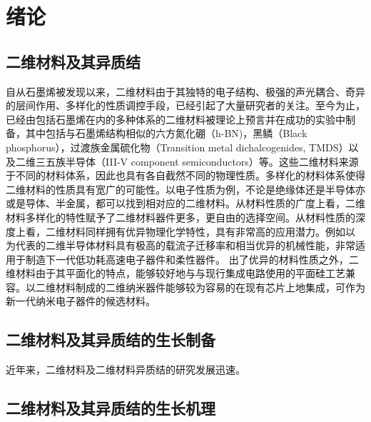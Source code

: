 \chapter{绪\hspace{6pt}论}

\section{二维材料及其异质结}
自从石墨烯被发现以来，二维材料由于其独特的电子结构、极强的声光耦合、奇异的层间作用、多样化的性质调控手段，已经引起了大量研究者的关注。至今为止，已经由包括石墨烯在内的多种体系的二维材料被理论上预言并在成功的实验中制备，其中包括与石墨烯结构相似的六方氮化硼（h-BN)，黑鳞（Black phosphorus），过渡族金属硫化物（Transition metal dichalcogenides, TMDS）以及二维三五族半导体（III-V component semiconductors）等。这些二维材料来源于不同的材料体系，因此也具有各自截然不同的物理性质。多样化的材料体系使得二维材料的性质具有宽广的可能性。以电子性质为例，不论是绝缘体还是半导体亦或是导体、半金属，都可以找到相对应的二维材料。从材料性质的广度上看，二维材料多样化的特性赋予了二维材料器件更多，更自由的选择空间。从材料性质的深度上看，二维材料同样拥有优异物理化学特性，具有非常高的应用潜力。例如以
为代表的二维半导体材料具有极高的载流子迁移率和相当优异的机械性能，非常适用于制造下一代低功耗高速电子器件和柔性器件。
出了优异的材料性质之外，二维材料由于其平面化的特点，能够较好地与与现行集成电路使用的平面硅工艺兼容。以二维材料制成的二维纳米器件能够较为容易的在现有芯片上地集成，可作为新一代纳米电子器件的候选材料。


\section{二维材料及其异质结的生长制备}
近年来，二维材料及二维材料异质结的研究发展迅速。

\section{二维材料及其异质结的生长机理}

